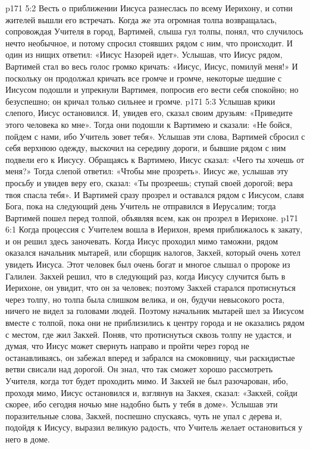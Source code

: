 \vs p171 5:2 Весть о приближении Иисуса разнеслась по всему Иерихону, и сотни жителей вышли его встречать. Когда же эта огромная толпа возвращалась, сопровождая Учителя в город, Вартимей, слыша гул толпы, понял, что случилось нечто необычное, и потому спросил стоявших рядом с ним, что происходит. И один из нищих ответил: «Иисус Назорей идет». Услышав, что Иисус рядом, Вартимей стал во весь голос громко кричать: «Иисус, Иисус, помилуй меня!» И поскольку он продолжал кричать все громче и громче, некоторые шедшие с Иисусом подошли и упрекнули Вартимея, попросив его вести себя спокойно; но безуспешно; он кричал только сильнее и громче.
\vs p171 5:3 Услышав крики слепого, Иисус остановился. И, увидев его, сказал своим друзьям: «Приведите этого человека ко мне». Тогда они подошли к Вартимею и сказали: «Не бойся, пойдем с нами, ибо Учитель зовет тебя». Услышав эти слова, Вартимей сбросил с себя верхнюю одежду, выскочил на середину дороги, и бывшие рядом с ним подвели его к Иисусу. Обращаясь к Вартимею, Иисус сказал: «Чего ты хочешь от меня?» Тогда слепой ответил: «Чтобы мне прозреть». Иисус же, услышав эту просьбу и увидев веру его, сказал: «Ты прозреешь; ступай своей дорогой; вера твоя спасла тебя». И Вартимей сразу прозрел и оставался рядом с Иисусом, славя Бога, пока на следующий день Учитель не отправился в Иерусалим; тогда Вартимей пошел перед толпой, объявляя всем, как он прозрел в Иерихоне.
\vs p171 6:1 Когда процессия с Учителем вошла в Иерихон, время приближалось к закату, и он решил здесь заночевать. Когда Иисус проходил мимо таможни, рядом оказался начальник мытарей, или сборщик налогов, Закхей, который очень хотел увидеть Иисуса. Этот человек был очень богат и многое слышал о пророке из Галилеи. Закхей решил, что в следующий раз, когда Иисусу случится быть в Иерихоне, он увидит, что он за человек; поэтому Закхей старался протиснуться через толпу, но толпа была слишком велика, и он, будучи невысокого роста, ничего не видел за головами людей. Поэтому начальник мытарей шел за Иисусом вместе с толпой, пока они не приблизились к центру города и не оказались рядом с местом, где жил Закхей. Поняв, что протиснуться сквозь толпу не удастся, и думая, что Иисус может свернуть направо и пройти через город не останавливаясь, он забежал вперед и забрался на смоковницу, чьи раскидистые ветви свисали над дорогой. Он знал, что так сможет хорошо рассмотреть Учителя, когда тот будет проходить мимо. И Закхей не был разочарован, ибо, проходя мимо, Иисус остановился и, взглянув на Закхея, сказал: «Закхей, сойди скорее, ибо сегодня ночью мне надобно быть у тебя в доме». Услышав эти поразительные слова, Закхей, поспешно спускаясь, чуть не упал с дерева и, подойдя к Иисусу, выразил великую радость, что Учитель желает остановиться у него в доме.
